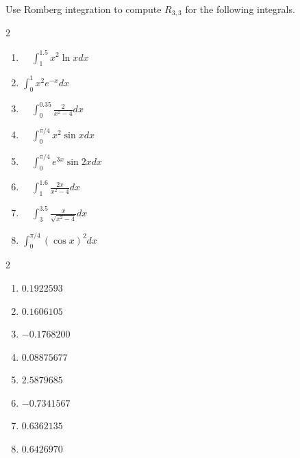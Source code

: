 \begin{myexercise}%
Use Romberg integration to compute $R_{3,3}$ for the following integrals.
\begin{multicols}{2}
\begin{enumerate}[label=(\alph*)]
\item  $\quad \int_{1}^{1.5} x^{2} \ln x d x$\\
\item $\int_{0}^{1} x^{2} e^{-x} d x$\\
\item $\quad \int_{0}^{0.35} \frac{2}{x^{2}-4} d x$\\
\item $\quad \int_{0}^{\pi / 4} x^{2} \sin x d x$\\
\item $\quad \int_{0}^{\pi / 4} e^{3 x} \sin 2 x d x$\\
\item $\quad \int_{1}^{1.6} \frac{2 x}{x^{2}-4} d x$\\
\item $\quad \int_{3}^{3.5} \frac{x}{\sqrt{x^{2}-4}} d x$\\
\item $\int_{0}^{\pi / 4}(\cos x)^{2} d x$
\end{enumerate}
\end{multicols}
\begin{mysolution}
\begin{multicols}{2}
\begin{enumerate}[label=(\alph*)]
\item $0.1922593$ \item $0.1606105$ \item $-0.1768200$ \item $0.08875677$ \item $2.5879685$ \item $-0.7341567$ \item $0.6362135$ \item $0.6426970$
\end{enumerate}
\end{multicols}
\end{mysolution}
\end{myexercise}



